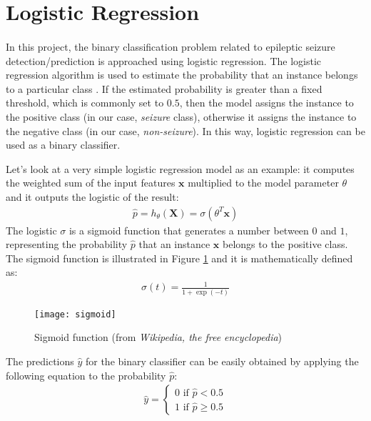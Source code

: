 \section{Logistic Regression} \label{sec: logistic_regression}

\paragraph{} In this project, the binary classification problem related to epileptic seizure detection/prediction is approached using logistic regression. The logistic regression algorithm is used to estimate the probability that an instance belongs to a particular class \cite{OReilly:handsonML}. If the estimated probability is greater than a fixed threshold, which is commonly set to $0.5$, then the model assigns the instance to the positive class (in our case, \textit{seizure} class), otherwise it assigns the instance to the negative class (in our case, \textit{non-seizure}). In this way, logistic regression can be used as a binary classifier.

Let's look at a very simple logistic regression model as an example: it computes the weighted sum of the input features $\mathbf{x}$ multiplied to the model parameter $\theta$ and it outputs the logistic of the result:
\begin{align}
    \hat{p} = h_{\theta}(\mathbf{X}) = \sigma\left(\theta^T \mathbf{x}\right)
\end{align}
The logistic $\sigma$ is a sigmoid function that generates a number between $0$ and $1$, representing the probability $\hat{p}$ that an instance $\mathbf{x}$ belongs to the positive class. The sigmoid function is illustrated in Figure \ref{fig:sigmoid} and it is mathematically defined as:
\begin{align}
    \sigma(t) = \frac{1}{1 + \exp{(-t)}}
\end{align}

\begin{figure}[htbp]
    \centering
    \texttt{[image: sigmoid]}
    \caption{Sigmoid function (from \textit{Wikipedia, the free encyclopedia})}
    \label{fig:sigmoid}
\end{figure}

The predictions $\hat{y}$ for the binary classifier can be easily obtained by applying the following equation to the probability $\hat{p}$:
\begin{align}
    \hat{y} = \left\{\begin{array}{l}{0 \text { if } \hat{p}<0.5} \\ {1 \text { if } \hat{p} \geq 0.5}\end{array}\right.
\end{align}

